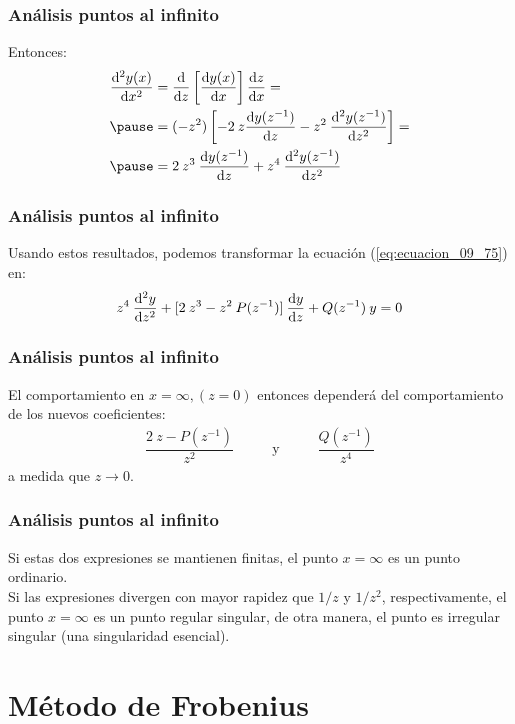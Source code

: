\documentclass[12pt]{beamer}
\begin{document}
\begin{frame}
\frametitle{Análisis puntos al infinito}
Entonces:
\pause
\begin{eqnarray}
\begin{aligned}
\dv[2]{y(x)}{x} &= \dv{z} \left[ \dv{y(x)}{x} \right] \dv{z}{x} = \\ \pause
&= (-z^{2}) \left[ -2 \: z \dv{y(z^{-1})}{z} - z^{2} \: \dv[2]{y(z^{-1})}{z} \right] = \\ \pause
&= 2 \: z^{3} \: \dv{y(z^{-1})}{z} + z^{4} \: \dv[2]{y(z^{-1})}{z}
\end{aligned}
\label{eq:ecuacion_09_77}
\end{eqnarray}
\end{frame}
\begin{frame}
\frametitle{Análisis puntos al infinito}
Usando estos resultados, podemos transformar la ecuación (\ref{eq:ecuacion_09_75}) en:
\pause
\begin{align}
z^{4} \: \dv[2]{y}{z} + [ 2 \: z^{3} - z^{2} \: P (z^{-1})] \: \dv{y}{z} + Q (z^{-1}) \: y = 0
\label{eq:ecuacion_09_78}
\end{align}
\end{frame}
\begin{frame}
\frametitle{Análisis puntos al infinito}
El comportamiento en $x = \infty, (z = 0)$ entonces dependerá del comportamiento de los nuevos coeficientes:
\pause
\begin{align*}
\dfrac{2 \: z - P(z^{-1})}{z^{2}} \hspace{1cm} \text{ y } \hspace{1cm} \dfrac{Q(z^{-1})}{z^{4}}
\end{align*}
a medida que $z \to 0$.
\end{frame}
\begin{frame}
\frametitle{Análisis puntos al infinito}
Si estas dos expresiones se mantienen finitas, el punto $x = \infty$ es un punto ordinario.
\\
\bigskip
\pause
Si las expresiones divergen con mayor rapidez que $1/z$ y $1/z^{2}$, respectivamente, el punto $x = \infty$ es un punto regular singular, de otra manera, el punto es irregular singular (una singularidad esencial).
\end{frame}

\section{Método de Frobenius}
\end{document}

